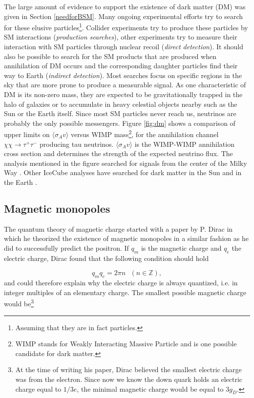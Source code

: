 The large amount of evidence to support the existence of dark matter (DM) was given in Section \ref{needforBSM}. Many ongoing experimental efforts try to search for these elusive particles\footnote{Assuming that they are in fact particles.}. Collider experiments try to produce these particles by SM interactions (\textit{production searches}), other experiments try to measure their interaction with SM particles through nuclear recoil (\textit{direct detection}). It should also be possible to search for the SM products that are produced when annihilation of DM occurs and the corresponding daughter particles find their way to Earth (\textit{indirect detection}). Most searches focus on specific regions in the sky that are more prone to produce a measurable signal. As one characteristic of DM is its non-zero mass, they are expected to be gravitationally trapped in the halo of galaxies or to accumulate in heavy celestial objects nearby such as the Sun or the Earth itself. Since most SM particles never reach us, neutrinos are probably the only possible messengers. Figure \ref{fig:dm} shows a comparison of upper limits on $\langle \sigma_A v\rangle$ versus WIMP mass\footnote{WIMP stands for Weakly Interacting Massive Particle and is one possible candidate for dark matter.}, for the annihilation channel $\chi \chi \rightarrow \tau^+ \tau^-$ producing tau neutrinos. $\langle \sigma_A v\rangle$ is the WIMP-WIMP annihilation cross section and determines the strength of the expected neutrino flux. The analysis mentioned in the figure searched for signals from the center of the Milky Way \cite{Aartsen:2017ulx}. Other IceCube analyses have searched for dark matter in the Sun \cite{Aartsen:2016zhm,Abbasi:2009vg} and in the Earth \cite{Aartsen:2016fep}.

\subsection{Magnetic monopoles}
\label{subsec:monopoles}
The quantum theory of magnetic charge started with a paper by P. Dirac \cite{Dirac60} in which he theorized the existence of magnetic monopoles in a similar fashion as he did to successfully predict the positron. If $q_m$ is the magnetic charge and $q_e$ the electric charge, Dirac found that the following condition should hold

\begin{equation}
q_m q_e = 2\pi n \ \ \ (n \in \mathbb{Z}),
\end{equation}
and could therefore explain why the electric charge is always quantized, i.e. in integer multiples of an elementary charge. The smallest possible magnetic charge  would be\footnote{At the time of writing his paper, Dirac believed the smallest electric charge was from the electron. Since now we know the down quark holds an electric charge equal to $1/3 e$, the minimal magnetic charge would be equal to $3g_D$.} 

